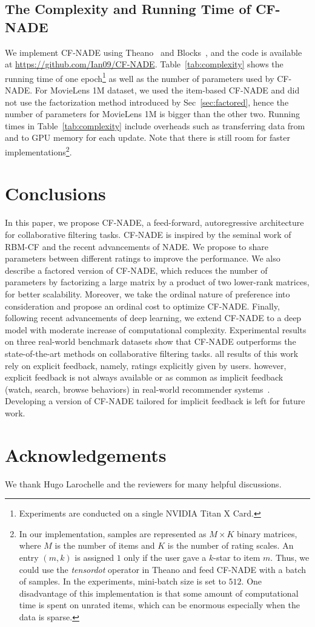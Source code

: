 \documentclass{article}
\newcommand{\cfnade}{CF-NADE\xspace}
\begin{document}
\subsection{The Complexity and Running Time of CF-NADE}
\label{exp:complexity}




We implement \cfnade using Theano~\cite{Bastien-Theano-2012} and
Blocks~\citep{van2015blocks}, and the code is available at
\url{https://github.com/Ian09/CF-NADE}. Table~\ref{tab:complexity} shows
the running time of one epoch\footnote{Experiments are conducted on a single NVIDIA Titan X Card.}  as
well as the number of parameters used by \cfnade. For MovieLens 1M dataset, we used the
item-based \cfnade and did not use the factorization method introduced
by Sec~\ref{sec:factored}, hence the number of parameters for
MovieLens 1M is bigger than the other two. Running times in
Table~\ref{tab:complexity} include overheads such as transferring data
from and to GPU memory for each update. Note that
there is still room for faster implementations\footnote{In our implementation, samples are
  represented as $M\times K$ binary matrices, where $M$ is the number
  of items and $K$ is the number of rating scales. An entry $(m,k)$ is
  assigned $1$ only if the user gave a $k$-star to item $m$. Thus, we
  could use the {\it tensordot} operator in Theano and feed \cfnade
  with a batch of samples. In the experiments, mini-batch size is set
  to $512$. One disadvantage of this implementation is that some
  amount of computational time is spent on unrated items, which can be
  enormous especially when the data is sparse.
}.




\section{Conclusions}
\label{sec:conclusion}

In this paper, we propose \cfnade, a feed-forward, autoregressive
architecture for collaborative filtering tasks. \cfnade is inspired by
the seminal work of RBM-CF and the
recent advancements of NADE. We 
propose to share parameters between different ratings to improve the
performance. We also describe a factored version of
\cfnade, which reduces the number of parameters by factorizing a large matrix by a product of two lower-rank matrices,
for better scalability. Moreover, we take the ordinal nature of
preference into consideration and propose an ordinal cost to optimize \cfnade. Finally,
following recent advancements of deep learning, we extend \cfnade to a
deep model with moderate increase of computational
complexity. Experimental results on three real-world benchmark datasets show
that \cfnade outperforms the state-of-the-art methods on
collaborative filtering tasks. all results of this work rely on explicit feedback, namely, ratings explicitly given by users. however, explicit feedback is not always available or as common as implicit feedback (watch, search, browse behaviors) in real-world recommender systems~\cite{hu2008collaborative}. Developing a version of \cfnade tailored for implicit feedback is left for future work.

\section*{Acknowledgements} 
We thank Hugo Larochelle and the reviewers for many helpful discussions.



\end{document}
